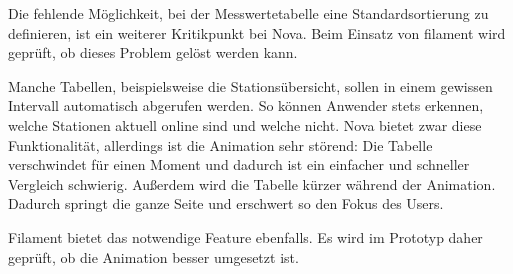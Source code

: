 Die fehlende Möglichkeit, bei der Messwertetabelle eine Standardsortierung zu definieren, ist ein weiterer Kritikpunkt bei Nova.
Beim Einsatz von filament wird geprüft, ob dieses Problem gelöst werden kann.

Manche Tabellen, beispielsweise die Stationsübersicht, sollen in einem gewissen Intervall automatisch abgerufen werden.
So können Anwender stets erkennen, welche Stationen aktuell online sind und welche nicht.
Nova bietet zwar diese Funktionalität, allerdings ist die Animation sehr störend:
Die Tabelle verschwindet für einen Moment und dadurch ist ein einfacher und schneller Vergleich schwierig.
Außerdem wird die Tabelle kürzer während der Animation.
Dadurch springt die ganze Seite und erschwert so den Fokus des Users.

Filament bietet das notwendige Feature ebenfalls.
Es wird im Prototyp daher geprüft, ob die Animation besser umgesetzt ist.
